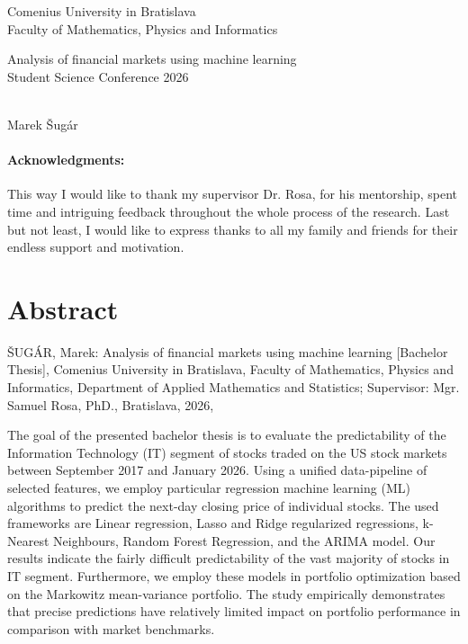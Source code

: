 \documentclass[12pt, oneside]{book}  %
\def\mfrok{2026}
\def\mfnazov{Analysis of financial markets using machine learning}
\def\mftyp{ Student Science Conference 2026}
\def\mfautor{Marek Šugár}
\begin{document}
   

\frontmatter
\pagestyle{empty}


\begin{center}
  \sc\large
  Comenius University in Bratislava\\
  Faculty of Mathematics, Physics and Informatics

\vfill

{\LARGE\mfnazov}\\
\mftyp
\end{center}

\vfill

{\sc\large 
\noindent \mfrok\\
\mfautor
}

\cleardoublepage

\newpage
\pagestyle{plain}
\paragraph{Acknowledgments:} This way I would like to thank my supervisor Dr. Rosa, for his mentorship, spent time and intriguing feedback throughout the whole process of the research.
Last but not least, I would like to express thanks to all my family and friends for their endless support and motivation.


\newpage 
\section*{Abstract}


ŠUGÁR, Marek: Analysis of financial markets using machine learning [Bachelor Thesis], Comenius University in Bratislava, Faculty of Mathematics, Physics and Informatics,
Department of Applied Mathematics and Statistics; Supervisor: Mgr. Samuel Rosa, PhD., Bratislava, 2026, %

The goal of the presented bachelor thesis is to evaluate the predictability of the Information Technology (IT) segment of stocks traded on the US stock markets between September 2017 and January 2026. 
Using a unified data-pipeline of selected features, we employ particular regression machine learning (ML) algorithms to predict the next-day closing price of individual stocks.
The used frameworks are Linear regression, Lasso and Ridge regularized regressions, k-Nearest Neighbours, Random Forest Regression, and the ARIMA model. Our results indicate the fairly difficult predictability
of the vast majority of stocks in IT segment. Furthermore, we employ these models in portfolio optimization based on the Markowitz mean-variance portfolio. The study empirically demonstrates that precise predictions have relatively
limited impact on portfolio performance in comparison with market benchmarks.
\end{document}
